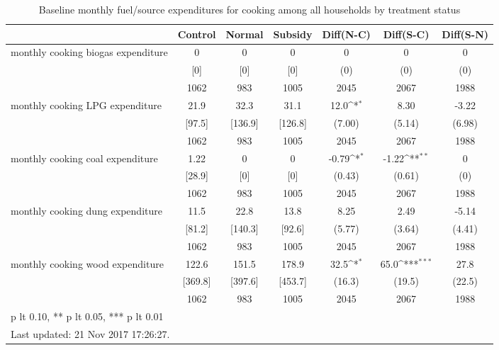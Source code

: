 \begin{table}[htbp]\centering
\def\sym#1{\ifmmode^{#1}\else\(^{#1}\)\fi}
\caption{Baseline monthly fuel/source expenditures for cooking among all households by treatment status \label{tab:"balance"}}
\begin{tabular*}{1\hsize}{@{\hskip\tabcolsep\extracolsep\fill}l*{1}{cccccc}}
\toprule
                                &  Control&   Normal&  Subsidy&Diff(N-C)         &Diff(S-C)         &Diff(S-N)         \\
\midrule
monthly cooking biogas expenditure&        0&        0&        0&        0         &        0         &        0         \\
                                &      [0]&      [0]&      [0]&      (0)         &      (0)         &      (0)         \\
                                &     1062&      983&     1005&     2045         &     2067         &     1988         \\
monthly cooking LPG expenditure &     21.9&     32.3&     31.1&     12.0\sym{*}  &     8.30         &    -3.22         \\
                                &   [97.5]&  [136.9]&  [126.8]&   (7.00)         &   (5.14)         &   (6.98)         \\
                                &     1062&      983&     1005&     2045         &     2067         &     1988         \\
monthly cooking coal expenditure&     1.22&        0&        0&    -0.79\sym{*}  &    -1.22\sym{**} &        0         \\
                                &   [28.9]&      [0]&      [0]&   (0.43)         &   (0.61)         &      (0)         \\
                                &     1062&      983&     1005&     2045         &     2067         &     1988         \\
monthly cooking dung expenditure&     11.5&     22.8&     13.8&     8.25         &     2.49         &    -5.14         \\
                                &   [81.2]&  [140.3]&   [92.6]&   (5.77)         &   (3.64)         &   (4.41)         \\
                                &     1062&      983&     1005&     2045         &     2067         &     1988         \\
monthly cooking wood expenditure&    122.6&    151.5&    178.9&     32.5\sym{*}  &     65.0\sym{***}&     27.8         \\
                                &  [369.8]&  [397.6]&  [453.7]&   (16.3)         &   (19.5)         &   (22.5)         \\
                                &     1062&      983&     1005&     2045         &     2067         &     1988         \\
\bottomrule
\multicolumn{7}{l}{\footnotesize * p lt 0.10, ** p lt 0.05, *** p lt 0.01}\\
\multicolumn{7}{l}{\footnotesize Last updated: 21 Nov 2017 17:26:27.}\\
\end{tabular*}
\end{table}
